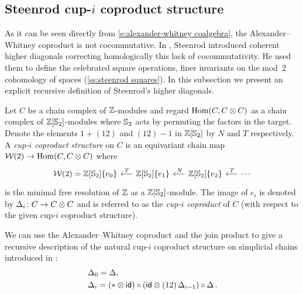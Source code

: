 \subsection{Steenrod cup-$i$ coproduct structure} \label{ss:cup-i}

As it can be seen directly from \eqref{e:alexander-whitney coalgebra}, the Alexander--Whitney coproduct is not cocommutative.
In \cite{steenrod1947products}, Steenrod introduced coherent higher diagonals correcting homologically this lack of cocommutativity.
He used them to define the celebrated square operations, finer invariants on the mod~2 cohomology of spaces (\cref{ss:steenrod squares}).
In this subsection we present an explicit recursive definition of Steenrod's higher diagonals.

Let $C$ be a chain complex of $\mathbb{Z}$-modules and regard $\mathrm{Hom}(C, C \otimes C)$ as a chain complex of $\mathbb{Z}[\mathbb{S}_2]$-modules where $\mathbb{S}_2$ acts by permuting the factors in the target.
Denote the elements $1 + (12)$ and $(12) - 1$ in $\mathbb{Z}[\mathbb{S}_2]$ by $N$ and $T$ respectively.
A \textit{cup-$i$ coproduct structure} on $C$ is an equivariant chain map
$\mathcal{W}(2) \to \mathrm{Hom}(C, C \otimes C)$ where
\begin{equation} \label{e:minimal resolution r=2}
\begin{tikzcd} [column sep = .5cm]
\mathcal W(2) = \Z[\Sym_2]\{e_0\} & \arrow[l, "\,T"'] \Z[\Sym_2]\{e_1\} & \arrow[l, "\,N"'] \Z[\Sym_2]\{e_2\} & \arrow[l, "\,T"'] \cdots
\end{tikzcd}
\end{equation}
is the minimal free resolution of $\mathbb{Z}$ as a $\mathbb{Z}[\mathbb{S}_2]$-module.
The image of $e_i$ is denoted by $\operatorname{\Delta}_i \colon C \to C \otimes C$ and is referred to as the \textit{cup-$i$ coproduct} of $C$ (with respect to the given cup-$i$ coproduct structure).

We can use the Alexander--Whitney coproduct and the join product to give a recursive description of the natural cup-$i$ coproduct structure on simplicial chains introduced in \cite[p.293]{steenrod1947products}:
\begin{equation} \label{e:cup-i coproducts}
\begin{split}
& \operatorname{\Delta}_0 = \operatorname{\Delta}, \\
& \operatorname{\Delta}_i =
(\ast \otimes \mathsf{id}) \circ (\mathsf{id} \otimes (12)\operatorname{\Delta}_{i-1}) \circ \operatorname{\Delta}.
\end{split}
\end{equation}


